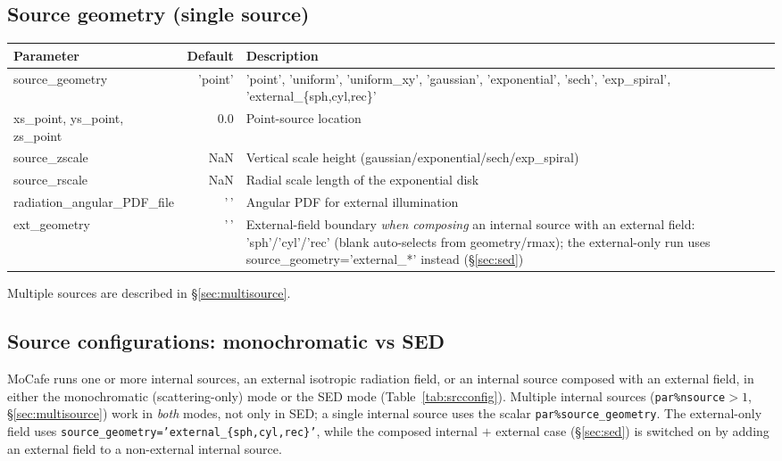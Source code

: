 \documentclass[english,a4paper]{kiseon_memo}
\newcommand{\pp}[1]{\texttt{par\%#1}}
\newcommand{\code}[1]{\texttt{#1}}
\begin{document}
\subsection{Source geometry (single source)}
\begin{longtable}{P D X}
\toprule
\textrm{Parameter} & \textrm{Default} & \textrm{Description}\\
\midrule \endhead
source\_geometry   & 'point'& 'point', 'uniform', 'uniform\_xy', 'gaussian', 'exponential', 'sech', 'exp\_spiral', 'external\_\{sph,cyl,rec\}'\\
xs\_point, ys\_point, zs\_point & 0.0 & Point-source location\\
source\_zscale     & NaN    & Vertical scale height (gaussian/exponential/sech/exp\_spiral)\\
source\_rscale     & NaN    & Radial scale length of the exponential disk\\
radiation\_angular\_PDF\_file & '\,' & Angular PDF for external illumination\\
ext\_geometry      & '\,' & External-field boundary \emph{when composing} an internal source with an external field: 'sph'/'cyl'/'rec' (blank auto-selects from geometry/rmax); the external-only run uses source\_geometry='external\_*' instead (\S\ref{sec:sed})\\
\bottomrule
\end{longtable}
Multiple sources are described in \S\ref{sec:multisource}.

\subsection{Source configurations: monochromatic vs SED}\label{sec:srcconfig}
MoCafe runs one or more internal sources, an external isotropic radiation field,
or an internal source composed with an external field, in either the
monochromatic (scattering-only) mode or the SED mode
(Table~\ref{tab:srcconfig}).  Multiple internal sources (\pp{nsource}${}>1$,
\S\ref{sec:multisource}) work in \emph{both} modes, not only in SED; a single
internal source uses the scalar \pp{source\_geometry}.  The external-only field
uses \code{source\_geometry='external\_\{sph,cyl,rec\}'}, while the composed
internal $+$ external case (\S\ref{sec:sed}) is switched on by adding an external
field to a non-external internal source.
\end{document}

